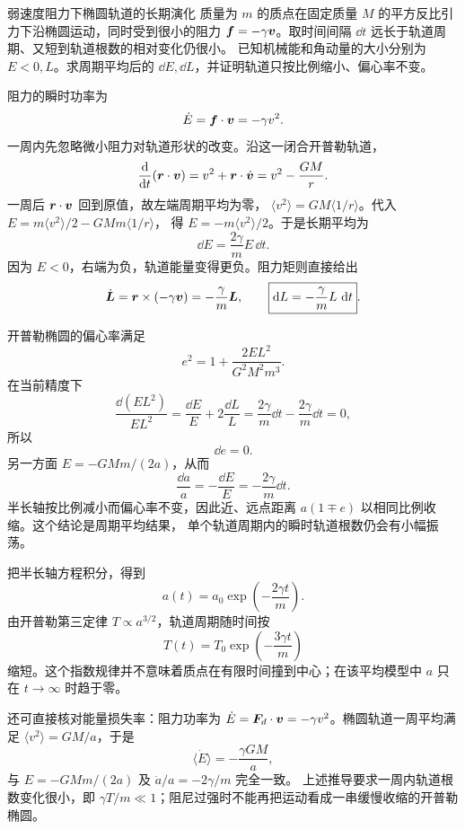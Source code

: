 \begin{origexamplebox}{弱速度阻力下椭圆轨道的长期演化}
\label{ch11:ex:08}
质量为 $m$ 的质点在固定质量 $M$ 的平方反比引力下沿椭圆运动，同时受到很小的阻力
$\bm{f}=-\gamma\bm{v}$。取时间间隔 $\dd t$ 远长于轨道周期、又短到轨道根数的相对变化仍很小。
已知机械能和角动量的大小分别为 $E<0,L$。求周期平均后的 $\dd E,\dd L$，并证明轨道只按比例缩小、偏心率不变。

\ThQOrbitDrag
\end{origexamplebox}
\begin{xesolution}
\ThAOrbitDrag

阻力的瞬时功率为
\[
 \dot E=\bm{f}\cdot\bm{v}=-\gamma v^2.
\]
一周内先忽略微小阻力对轨道形状的改变。沿这一闭合开普勒轨道，
\[
 \frac{\mathop{}\!\mathrm d}{\mathop{}\!\mathrm d t}(\bm{r}\cdot\bm{v})
 =v^2+\bm{r}\cdot\dot{\bm{v}}=v^2-\frac{GM}{r}.
\]
一周后 $\bm{r}\cdot\bm{v}$ 回到原值，故左端周期平均为零，
$\langle v^2\rangle=GM\langle1/r\rangle$。代入
$E=m\langle v^2\rangle/2-GMm\langle1/r\rangle$，
得 $E=-m\langle v^2\rangle/2$。于是长期平均为
\[
 \boxed{\dd E=\frac{2\gamma}{m}E\,\dd t}.
\]
因为 $E<0$，右端为负，轨道能量变得更负。阻力矩则直接给出
\[
 \dot{\bm{L}}=\bm{r}\times(-\gamma\bm{v})
 =-\frac\gamma m\bm{L},
 \qquad
 \boxed{\mathop{}\!\mathrm d L=-\frac\gamma mL\,\mathop{}\!\mathrm d t}.
\]

开普勒椭圆的偏心率满足
\[
 e^2=1+\frac{2EL^2}{G^2M^2m^3}.
\]
在当前精度下
\[
 \frac{\dd(EL^2)}{EL^2}
 =\frac{\dd E}{E}+2\frac{\dd L}{L}
 =\frac{2\gamma}{m}\dd t-\frac{2\gamma}{m}\dd t=0,
\]
所以
\[
 \boxed{\dd e=0}.
\]
另一方面 $E=-GMm/(2a)$，从而
\[
 \frac{\dd a}{a}=-\frac{\dd E}{E}
 =-\frac{2\gamma}{m}\dd t.
\]
半长轴按比例减小而偏心率不变，因此近、远点距离 $a(1\mp e)$ 以相同比例收缩。这个结论是周期平均结果，
单个轨道周期内的瞬时轨道根数仍会有小幅振荡。

把半长轴方程积分，得到
\[
 \boxed{a(t)=a_0\exp\!\left(-\frac{2\gamma t}{m}\right)}.
\]
由开普勒第三定律 $T\propto a^{3/2}$，轨道周期随时间按
\[
 \boxed{T(t)=T_0\exp\!\left(-\frac{3\gamma t}{m}\right)}
\]
缩短。这个指数规律并不意味着质点在有限时间撞到中心；在该平均模型中 $a$ 只在
$t\to\infty$ 时趋于零。

还可直接核对能量损失率：阻力功率为
$\dot E=\bm{F}_d\cdot\bm{v}=-\gamma v^2$。椭圆轨道一周平均满足
$\langle v^2\rangle=GM/a$，于是
\[
 \langle\dot E\rangle=-\frac{\gamma GM}{a},
\]
与 $E=-GMm/(2a)$ 及 $\dot a/a=-2\gamma/m$ 完全一致。
上述推导要求一周内轨道根数变化很小，即 $\gamma T/m\ll1$；阻尼过强时不能再把运动看成一串缓慢收缩的开普勒椭圆。
\end{xesolution}

\endgroup

\hypersetup{bookmarksdepth=2}
